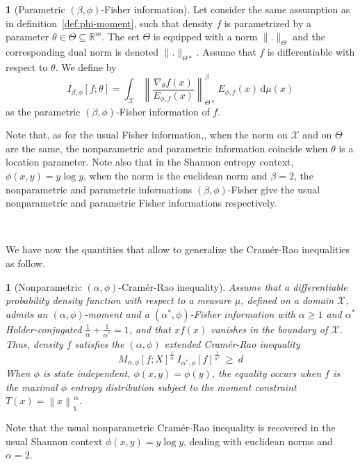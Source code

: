 \documentclass[english,sort&compress]{elsarticle}
\theoremstyle{definition}
\newtheorem{defn}{\protect\definitionname}
\theoremstyle{plain}
\newtheorem{prop}{\protect\propositionname}
\theoremstyle{plain}
\providecommand{\definitionname}{Definition}
\providecommand{\propositionname}{Proposition}
\def\dmu{\mathrm{d}\mu}
\def\Rset{\mathbb{R}}
\def\X{\mathcal{X}}
\begin{document}
\begin{defn}[Parametric $(\beta,\phi)$-Fisher information]\label{def:p-phi-Fisher}
  Let consider  the same assumption as  in definition~\ref{def:phi-moment}, such
  that density $f$  is parametrized by a parameter  $\theta \in \Theta \subseteq
  \Rset^m$.  The set  $\Theta$ is equipped with a  norm $\|.\|_{\Theta}$ and the
  corresponding  dual norm  is denoted  $\|.\|_{\Theta*}$.  Assume  that  $f$ is
  differentiable with respect to $\theta$. We define by
  \begin{equation}\label{eq:p-phi-Fisher}
  I_{\beta,\phi}[f;\theta] = \int_\X \left\| \frac{\nabla_\theta
  f(x)}{E_{\phi,f}(x)} \right\|_{\Theta*}^\beta \, E_{\phi,f}(x) \, \dmu(x)
  \end{equation}
  as the parametric $(\beta,\phi)$-Fisher information of $f$.
\end{defn}
%
Note that, as  for the usual Fisher  information,, when the norm on  $\X$ and on
$\Theta$  are the same,  the nonparametric  and parametric  information coincide
when $\theta$  is a location  parameter. Note also  that in the  Shannon entropy
context, $\phi(x,y) = y \log y$, when  the norm is the euclidean norm and $\beta
= 2$,  the nonparametric and parametric  informations $(\beta,\phi)$-Fisher give
the     usual    nonparametric     and     parametric    Fisher     informations
respectively.

\

We  have  now   the  quantities  that  allow  to   generalize  the  Cram\'er-Rao
inequalities as follow.
%
\begin{prop}[Nonparametric $(\alpha,\phi)$-Cram\'er-Rao inequality]\label{prop:np-phi-CR}
  Assume that  a differentiable probability  density function with respect  to a
  measure $\mu$, defined on a  domain $\X$, admits an $(\alpha,\phi)$-moment and
  a  $(\alpha^*,\phi)$-Fisher information  with  $\alpha \ge  1$ and  $\alpha^*$
  Holder-conjugated  $\frac{1}{\alpha} +  \frac{1}{\alpha^*} =  1$, and  that $x
  f(x)$  vanishes in  the boundary  of $\X$.   Thus, density  $f$  satisfies the
  $(\alpha,\phi)$ extended Cram\'er-Rao inequality
  \begin{equation}\label{eq:np-phi-CR}
   M_{\alpha,\phi}[f;X]^{\frac{1}{\alpha}} \: I_{\alpha^*\!,\phi}[f]^{\frac{1}{\alpha^*}}
   \: \ge \: d
  \end{equation}
  When $\phi$ is  state independent, $\phi(x,y) = \phi(y)$,  the equality occurs
  when  $f$ is the  maximal $\phi$  entropy distribution  subject to  the moment
  constraint $T(x) = \left\| x \right\|_{\chi}^{\, \alpha}$.
\end{prop}
%
Note that the usual nonparametric  Cram\'er-Rao inequality is recovered in the
usual Shannon context  $\phi(x,y) = y \log y$, dealing  with euclidean norms and
$\alpha = 2$.
\end{document}
